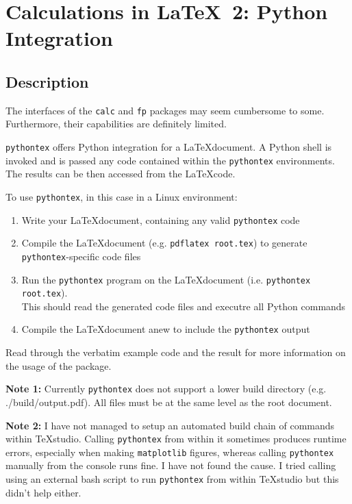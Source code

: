 \documentclass{article}
\begin{document}
\section*{Calculations in \LaTeX\ 2: Python Integration}

\subsection*{Description}

The interfaces of the \verb|calc| and \verb|fp| packages may seem cumbersome to some. Furthermore, their capabilities are definitely limited.

\verb|pythontex| offers Python integration for a \LaTeX document. A Python shell is invoked and is passed any code contained within the \verb|pythontex| environments.
The results can be then accessed from the \LaTeX code.

To use \verb|pythontex|, in this case in a Linux environment:
\begin{enumerate}
	\item Write your \LaTeX document, containing any valid \verb|pythontex| code
	\item Compile the \LaTeX document (e.g. \texttt{pdflatex root.tex}) to generate \verb|pythontex|-specific code files
	\item Run the \verb|pythontex| program on the \LaTeX document (i.e. \texttt{pythontex root.tex}).\\
	This should read the generated code files and executre all Python commands
	\item Compile the \LaTeX document anew to include the \verb|pythontex| output
\end{enumerate}

Read through the verbatim example code and the result for more information on the usage of the package.

\textbf{Note 1:} Currently \verb|pythontex| does not support a lower build directory (e.g. ./build/output.pdf). All files must be at the same level as the root document.

\textbf{Note 2:} I have not managed to setup an automated build chain of commands within TeXstudio. Calling \verb|pythontex| from within it sometimes produces runtime errors, especially when making \verb|matplotlib| figures, whereas calling \verb|pythontex| manually from the console runs fine. I have not found the cause.
I tried calling using an external bash script to run \verb|pythontex| from within TeXstudio but this didn't help either.
\end{document}
